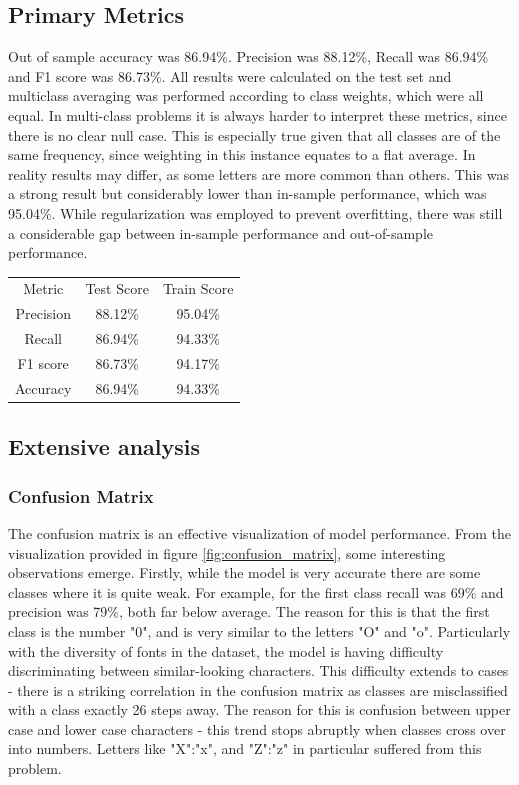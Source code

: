 \documentclass[fleqn,10pt]{SelfArx} %
\begin{document}
\subsection{Primary Metrics}
Out of sample accuracy was 86.94\%. Precision was 88.12\%, Recall was 86.94\% and F1 score was 86.73\%. All results were calculated on the test set and multiclass averaging was performed according to class weights, which were all equal. In multi-class problems it is always harder to interpret these metrics, since there is no clear null case. This is especially true given that all classes are of the same frequency, since weighting in this instance equates to a flat average. In reality results may differ, as some letters are more common than others.
\newline
This was a strong result but considerably lower than in-sample performance, which was 95.04\%. While regularization was employed to prevent overfitting, there was still a considerable gap between in-sample performance and out-of-sample performance.
\begin{center}
\begin{tabular}{ c c c }
 Metric & Test Score & Train Score  \\ 
 Precision & 88.12\% & 95.04\% \\
 Recall & 86.94\%  & 94.33\% \\
 F1 score & 86.73\% & 94.17\% \\  
 Accuracy & 86.94\% & 94.33\%     
\end{tabular}
\end{center}

\subsection{Extensive analysis}

\subsubsection{Confusion Matrix}
The confusion matrix is an effective visualization of model performance. From the visualization provided in figure \ref{fig:confusion_matrix}, some interesting observations emerge. Firstly, while the model is very accurate there are some classes where it is quite weak. For example, for the first class recall was 69\% and precision was 79\%, both far below average. The reason for this is that the first class is the number "0", and is very similar to the letters "O" and "o". Particularly with the diversity of fonts in the dataset, the model is having difficulty discriminating between similar-looking characters. This difficulty extends to cases - there is a striking correlation in the confusion matrix as classes are misclassified with a class exactly 26 steps away. The reason for this is confusion between upper case and lower case characters - this trend stops abruptly when classes cross over into numbers. Letters like "X":"x", and "Z":"z" in particular suffered from this problem.
\end{document}
